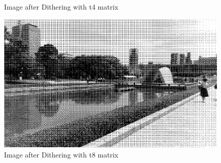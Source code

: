 \documentclass{article}
\begin{document}
\begin{enumerate}
\begin{figure}[H]
        \caption{Image after Dithering with t4 matrix}
        \label{fig:Image after Dithering with t2 matrix}
    \end{figure}
    \begin{figure}[H]
        \centering
        \includegraphics[width=0.75\linewidth]{343.png}
        \caption{Image after Dithering with t8 matrix}
        \label{fig:Image after Dithering with t8 matrix}
    \end{figure}
    \end{enumerate}
\end{document}
